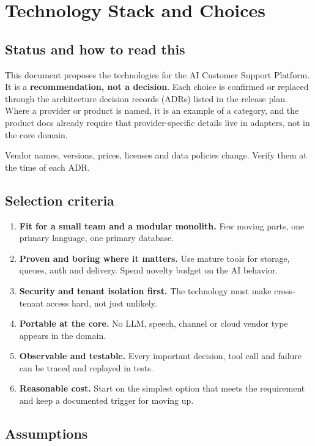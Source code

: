 \chapter{Technology Stack and Choices}

\section{Status and how to read this}

This document proposes the technologies for the AI Customer Support Platform. It is a \textbf{recommendation, not a decision}. Each choice is confirmed or replaced through the architecture decision records (ADRs) listed in the release plan. Where a provider or product is named, it is an example of a category, and the product docs already require that provider-specific details live in adapters, not in the core domain.

Vendor names, versions, prices, licenses and data policies change. Verify them at the time of each ADR.

\section{Selection criteria}

\begin{enumerate}
\item \textbf{Fit for a small team and a modular monolith.} Few moving parts, one primary language, one primary database.
\item \textbf{Proven and boring where it matters.} Use mature tools for storage, queues, auth and delivery. Spend novelty budget on the AI behavior.
\item \textbf{Security and tenant isolation first.} The technology must make cross-tenant access hard, not just unlikely.
\item \textbf{Portable at the core.} No LLM, speech, channel or cloud vendor type appears in the domain.
\item \textbf{Observable and testable.} Every important decision, tool call and failure can be traced and replayed in tests.
\item \textbf{Reasonable cost.} Start on the simplest option that meets the requirement and keep a documented trigger for moving up.
\end{enumerate}
\section{Assumptions}

